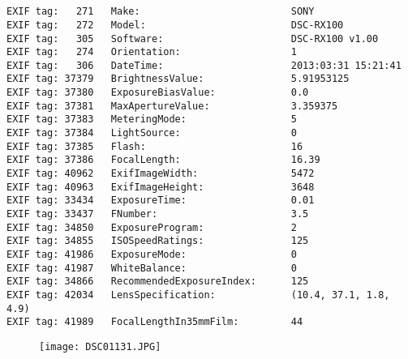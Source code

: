 \section{\protect{}}
\noindent 
\noindent
\begin{lstlisting}
EXIF tag:   271   Make:                          SONY
EXIF tag:   272   Model:                         DSC-RX100
EXIF tag:   305   Software:                      DSC-RX100 v1.00
EXIF tag:   274   Orientation:                   1
EXIF tag:   306   DateTime:                      2013:03:31 15:21:41
EXIF tag: 37379   BrightnessValue:               5.91953125
EXIF tag: 37380   ExposureBiasValue:             0.0
EXIF tag: 37381   MaxApertureValue:              3.359375
EXIF tag: 37383   MeteringMode:                  5
EXIF tag: 37384   LightSource:                   0
EXIF tag: 37385   Flash:                         16
EXIF tag: 37386   FocalLength:                   16.39
EXIF tag: 40962   ExifImageWidth:                5472
EXIF tag: 40963   ExifImageHeight:               3648
EXIF tag: 33434   ExposureTime:                  0.01
EXIF tag: 33437   FNumber:                       3.5
EXIF tag: 34850   ExposureProgram:               2
EXIF tag: 34855   ISOSpeedRatings:               125
EXIF tag: 41986   ExposureMode:                  0
EXIF tag: 41987   WhiteBalance:                  0
EXIF tag: 34866   RecommendedExposureIndex:      125
EXIF tag: 42034   LensSpecification:             (10.4, 37.1, 1.8, 4.9)
EXIF tag: 41989   FocalLengthIn35mmFilm:         44

\end{lstlisting}
\clearpage
\begin{figure}
\raggedleft
\texttt{[image: DSC01131.JPG]}
\end{figure}


\clearpage
